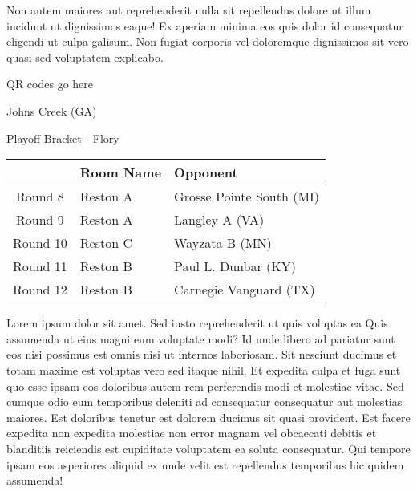 \documentclass{article}%
\begin{document}
\newline%
Non autem maiores aut reprehenderit nulla sit repellendus dolore ut illum incidunt ut dignissimos eaque! Ex aperiam minima eos quis dolor id consequatur eligendi ut culpa galisum. Non fugiat corporis vel doloremque dignissimos sit vero quasi sed voluptatem explicabo.\newline%
\newline%
%
\vspace*{30pt}%
\begin{center}%
\begin{Huge}%
QR codes go here%
\end{Huge}%
\end{center}%
\newpage%
\begin{center}%
\begin{Huge}%
Johns Creek (GA)%
\end{Huge}%
\vspace*{8pt}%
\linebreak%
\begin{Large}%
Playoff Bracket {-} Flory%
\end{Large}%
\end{center}%
\begin{tabularx}{\textwidth}{|c|Y|Y|}%
\hline%
&Room Name&Opponent\\%
\hline%
Round 8&Reston A&Grosse Pointe South (MI)\\%
Round 9&Reston A&Langley A (VA)\\%
Round 10&Reston C&Wayzata B (MN)\\%
Round 11&Reston B&Paul L. Dunbar (KY)\\%
Round 12&Reston B&Carnegie Vanguard (TX)\\%
\hline%
\end{tabularx}%
\vspace*{8pt}%
\linebreak%
\newline%
\newline%
Lorem ipsum dolor sit amet. Sed iusto reprehenderit ut quis voluptas ea Quis assumenda ut eius magni eum voluptate modi? Id unde libero ad pariatur sunt eos nisi possimus est omnis nisi ut internos laboriosam. Sit nesciunt ducimus et totam maxime est voluptas vero sed itaque nihil. Et expedita culpa et fuga sunt quo esse ipsam eos doloribus autem rem perferendis modi et molestiae vitae.\newline%
\newline%
Sed cumque odio eum temporibus deleniti ad consequatur consequatur aut molestias maiores. Est doloribus tenetur est dolorem ducimus sit quasi provident. Est facere expedita non expedita molestiae non error magnam vel obcaecati debitis et blanditiis reiciendis est cupiditate voluptatem ea soluta consequatur. Qui tempore ipsam eos asperiores aliquid ex unde velit est repellendus temporibus hic quidem assumenda!\newline%
\end{document}
